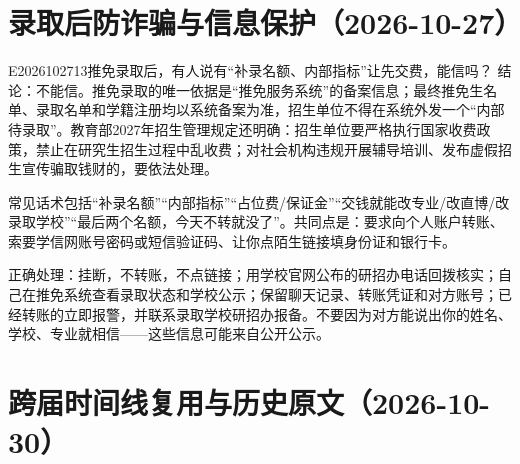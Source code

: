 \section{录取后防诈骗与信息保护（2026-10-27）}
\begin{qa}{E2026102713}{推免录取后，有人说有“补录名额、内部指标”让先交费，能信吗？}
结论：不能信。推免录取的唯一依据是“推免服务系统”的备案信息；最终推免生名单、录取名单和学籍注册均以系统备案为准，招生单位不得在系统外发一个“内部待录取”。教育部2027年招生管理规定还明确：招生单位要严格执行国家收费政策，禁止在研究生招生过程中乱收费；对社会机构违规开展辅导培训、发布虚假招生宣传骗取钱财的，要依法处理。

常见话术包括“补录名额”“内部指标”“占位费/保证金”“交钱就能改专业/改直博/改录取学校”“最后两个名额，今天不转就没了”。共同点是：要求向个人账户转账、索要学信网账号密码或短信验证码、让你点陌生链接填身份证和银行卡。

正确处理：挂断，不转账，不点链接；用学校官网公布的研招办电话回拨核实；自己在推免系统查看录取状态和学校公示；保留聊天记录、转账凭证和对方账号；已经转账的立即报警，并联系录取学校研招办报备。不要因为对方能说出你的姓名、学校、专业就相信——这些信息可能来自公开公示。
\end{qa}

\section{跨届时间线复用与历史原文（2026-10-30）}


